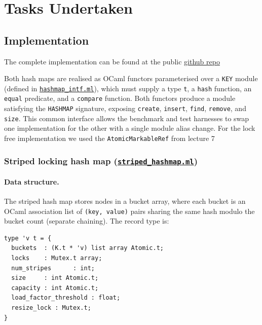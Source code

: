 \documentclass[11pt,a4paper]{article}
\begin{document}
\section{Tasks Undertaken}
\label{sec:tasks}

\subsection{Implementation}

The complete implementation can be found at the public \href{https://github.com/ogirala-srihasa/Concurrent-Hashmap/tree/main}{github repo}

Both hash maps are realised as OCaml functors parameterised over a \texttt{KEY}
module (defined in \href{https://github.com/ogirala-srihasa/Concurrent-Hashmap/blob/main/lib/hashmap_intf.ml}{\texttt{hashmap\_intf.ml}}), which must supply a type \texttt{t},
a \texttt{hash} function, an \texttt{equal} predicate, and a \texttt{compare}
function. Both functors produce a module satisfying the \texttt{HASHMAP}
signature, exposing \texttt{create}, \texttt{insert}, \texttt{find},
\texttt{remove}, and \texttt{size}. This common interface allows the benchmark
and test harnesses to swap one implementation for the other with a single
module alias change. For the lock free implementation we used the \texttt{AtomicMarkableRef} from lecture 7



\subsubsection{Striped locking hash map (\href{https://github.com/ogirala-srihasa/Concurrent-Hashmap/blob/main/lib/striped_hashmap.ml}{\texttt{striped\_hashmap.ml}})}

\paragraph{Data structure.}
The striped hash map stores nodes in a bucket array, where each bucket is an
OCaml association list of \texttt{(key, value)} pairs sharing the same hash
modulo the bucket count (separate chaining). The record type is:

\begin{verbatim}
type 'v t = {
  buckets  : (K.t * 'v) list array Atomic.t;
  locks    : Mutex.t array;
  num_stripes      : int;
  size     : int Atomic.t;
  capacity : int Atomic.t;
  load_factor_threshold : float;
  resize_lock : Mutex.t;
}
\end{verbatim}
\end{document}
